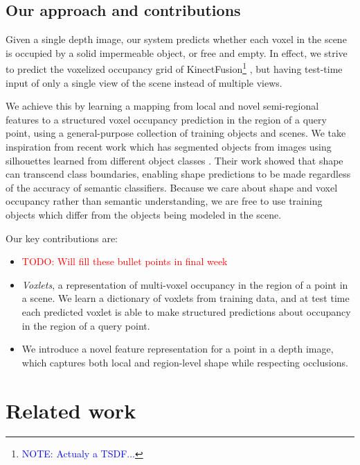 \documentclass[10pt,twocolumn,letterpaper]{article}
\newcommand{\todo}[1]{\textcolor{red}{TODO: #1}}
\newcommand{\note}[1]{\textcolor{blue}{NOTE: #1}}
\begin{document}
\subsection{Our approach and contributions}

Given a single depth image, our system predicts whether each voxel in the scene is occupied by a solid impermeable object, or free and empty.
In effect, we strive to predict the voxelized occupancy grid of KinectFusion\footnote{\note{Actualy a TSDF...}} \cite{izadi-uist-2011}, but having test-time input of only a single view of the scene instead of multiple views.

We achieve this by learning a mapping from local and novel semi-regional features to a structured voxel occupancy prediction in the region of a query point, using a general-purpose collection of training objects and scenes.
We take inspiration from recent work which has segmented objects from images using silhouettes learned from different object classes \cite{kim-eccv-2012}.
Their work showed that shape can transcend class boundaries, enabling shape predictions to be made regardless of the accuracy of semantic classifiers.
Because we care about shape and voxel occupancy rather than semantic understanding, we are free to use training objects which differ from the objects being modeled in the scene.

Our key contributions are:

\begin{itemize}
\item \todo{Will fill these bullet points in final week}
\item \emph{Voxlets}, a representation of multi-voxel occupancy in the region of a point in a scene. 
We learn a dictionary of voxlets from training data, and at test time each predicted voxlet is able to make structured predictions about occupancy in the region of a query point.
\item We introduce a novel feature representation for a point in a depth image, which captures both local and region-level shape while respecting occlusions.
\end{itemize}


\section{Related work}
\end{document}
